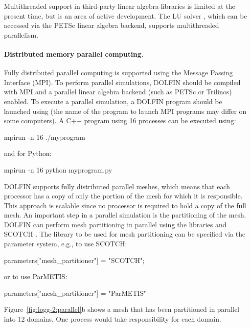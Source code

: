 Multithreaded support in third-party linear algebra libraries is limited
at the present time, but is an area of active development.  The LU solver
\citet{www:pastix}, which can be accessed via the PETSc linear algebra
backend, supports multithreaded parallelism.

\paragraph{Distributed memory parallel computing.}

Fully distributed parallel computing is supported using the Message
Passing Interface (MPI). To perform parallel simulations, DOLFIN should
be compiled with MPI and a parallel linear algebra backend (such as PETSc
or Trilinos) enabled. To execute a parallel simulation, a DOLFIN program
should be launched using  (the name of the program to launch MPI
programs may differ on some computers). A C++ program using 16 processes
can be executed using:
\begin{bash}
mpirun -n 16 ./myprogram
\end{bash}
and for Python:
\begin{bash}
mpirun -n 16 python myprogram.py
\end{bash}


DOLFIN supports fully distributed parallel meshes, which means that each
processor has a copy of only the portion of the mesh for which it is
responsible. This approach is scalable since no processor is required
to hold a copy of the full mesh.
An important step in a parallel simulation is the partitioning of the
mesh. DOLFIN can perform mesh partitioning in parallel using the libraries
\citet{www:parmetis} and SCOTCH \citep{www:scotch}.  The library to be
used for mesh partitioning can be specified via the parameter system,
e.g., to use SCOTCH:
\begin{c++}
parameters["mesh_partitioner"] = "SCOTCH";
\end{c++}
or to use ParMETIS:
\begin{python}
parameters["mesh_partitioner"] = "ParMETIS"
\end{python}
Figure~\ref{fig:logg-2:parallel}b shows a mesh that has been partitioned
in parallel into 12 domains. One process would take responsibility
for each domain.

